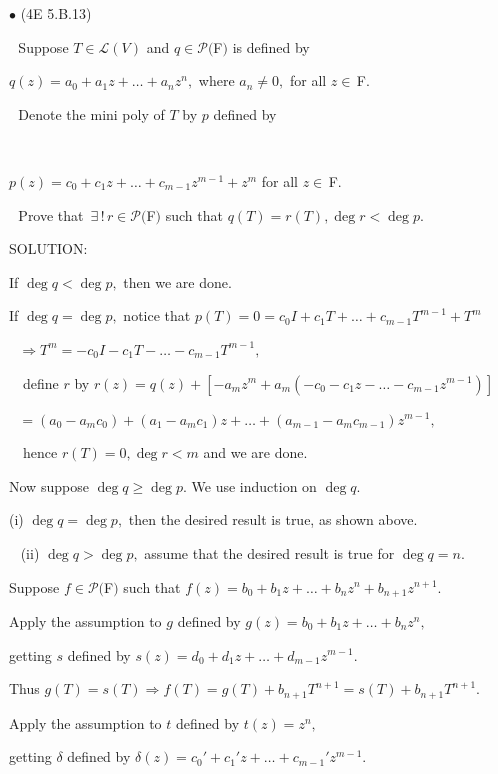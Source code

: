 \documentclass[a4paper, 11pt, UTF8]{article}
\def\Lm{\mathcal{L}}
\def\Po{\mathcal{P}}
\def\Fbfc{$\,{\timesbf F}$}
\begin{document}
\begin{large}
{\small $\bullet$} ({\normalsize 4E 5.B.13})\par\,\, {\timessl\Large 
Suppose $T\in \Lm(V)$ and $q \in \Po(${\timesbf F}$)$ is defined by}\par \centerline{\timessl\Large $q(z)=a_0 +a_1 z+\dots+a_n z^n,$ where $a_n\neq 0,$ for all $z\in\Fbfc.$}\par\,\,
{\timessl\Large Denote the mini poly of $T$ by $p$ defined by}\par\,\,
\centerline{\timessl\Large $p(z)=c_0+c_1 z+\dots+c_{m-1}z^{m-1}+z^m$ for all $z\in\Fbfc.$}\par\,\,
{\timessl\Large Prove that $\,\exists\,!\,r \in \Po(${\timesbf F}$)$ such that $q(T) = r(T),\deg r<\deg p.$
}\par
{\timesbf S\footnotesize{OLUTION:}}\par\quad
If $\deg q<\deg p,$ then we are done.\par\quad
If $\deg q=\deg p,$ notice that $p(T)=0=c_0 I+c_1 T+\dots+c_{m-1}T^{m-1}+T^m$\par\qquad\qquad\qquad\qquad\qquad\qquad\quad\,\,
$\Rightarrow T^m=-c_0 I-c_1 T-\dots-c_{m-1}T^{m-1},$\par\qquad\qquad\qquad\quad\,\,\,\,
define $r$ by $r(z)=q(z)+[-a_m z^m+a_m(-c_0-c_1 z-\dots-c_{m-1}z^{m-1})]$\par\qquad\qquad\qquad\qquad\qquad\qquad\qquad\,\,
$=(a_0-a_m c_0)+(a_1-a_m c_1)z+\dots+(a_{m-1}-a_m c_{m-1})z^{m-1},$\par\qquad\qquad\qquad\quad\,\,\,\,
hence $r(T)=0,\deg r<m$ and we are done.\par\quad
Now suppose $\deg q\geq\deg p.$ We use induction on $\deg q.$\par\quad
(i) $\deg q=\deg p,$ then the desired result is true, as shown above.\par\,\,\,
(ii) $\deg q>\deg p,$ assume that the desired result is true for $\deg q=n.$\par\qquad
Suppose $f\in\Po(${\timesbf F}$)$ such that $f(z)=b_0 +b_1 z+\dots+b_n z^{n}+b_{n+1}z^{n+1}.$\par\qquad
Apply the assumption to $g$ defined by $g(z)=b_0 +b_1 z+\dots+b_n z^{n},$
\par\qquad\qquad\qquad\qquad\quad getting $s$ defined by $s(z)=d_0+d_1 z+\dots+d_{m-1} z^{m-1}.$\par\qquad
Thus $g(T)=s(T)\Rightarrow f(T)=g(T)+b_{n+1}T^{n+1}=s(T)+b_{n+1}T^{n+1}.$\par\qquad
Apply the assumption to $t$ defined by $t(z)=z^n,$\par\qquad\qquad\qquad\qquad\quad getting $\delta$ defined by $\delta(z)=c_0' +c_1'z+\dots+c_{m-1}'z^{m-1}.$\par\qquad

\end{large}
\end{document}
